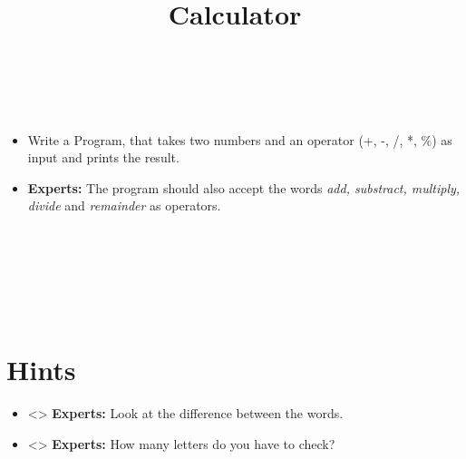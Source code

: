 


\title{Calculator} %
\author{} %
\renewcommand{\difficulty}{Medium} %
\renewcommand{\requirements}{Variables, input/output, conditions} %
\renewcommand{\aims}{make decisions during run time} %


 \maketitle
 \taskinfos

\ \\\ \\
\begin{itemize}
	\item Write a Program, that takes two numbers and an operator (+, -, /, *, \%) as input and prints the result.
		\item \textbf{Experts:} The program should also accept the words \textit{add, substract, multiply, divide} and \textit{remainder} as operators.
\end{itemize}	
 
 
\ \\\ \\\ \\\ \\\ \\
\section*{Hints}
	\begin{itemize}
		\item<> \textbf{Experts:} Look at the difference between the words.
		\item<> \textbf{Experts:} How many letters do you have to check?
	\end{itemize}
 

